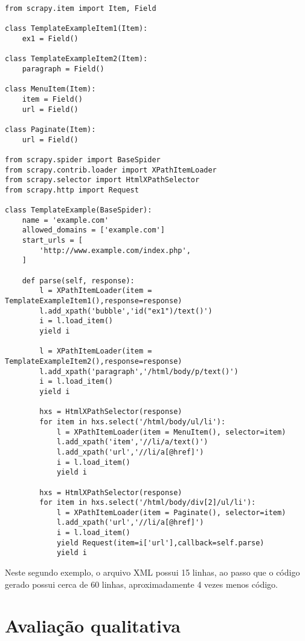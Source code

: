 \pagebreak
{}
\begin{lstlisting}
from scrapy.item import Item, Field

class TemplateExampleItem1(Item):
    ex1 = Field()

class TemplateExampleItem2(Item):
    paragraph = Field()
    
class MenuItem(Item):
    item = Field()
    url = Field()
    
class Paginate(Item):
    url = Field()

from scrapy.spider import BaseSpider
from scrapy.contrib.loader import XPathItemLoader
from scrapy.selector import HtmlXPathSelector
from scrapy.http import Request

class TemplateExample(BaseSpider):
    name = 'example.com'
    allowed_domains = ['example.com']
    start_urls = [
        'http://www.example.com/index.php',
    ]

    def parse(self, response):
        l = XPathItemLoader(item = TemplateExampleItem1(),response=response)
        l.add_xpath('bubble','id("ex1")/text()') 
        i = l.load_item()
        yield i
        
        l = XPathItemLoader(item = TemplateExampleItem2(),response=response)
        l.add_xpath('paragraph','/html/body/p/text()') 
        i = l.load_item()
        yield i
        
        hxs = HtmlXPathSelector(response)
        for item in hxs.select('/html/body/ul/li'):
            l = XPathItemLoader(item = MenuItem(), selector=item)
            l.add_xpath('item','//li/a/text()') 
            l.add_xpath('url','//li/a[@href]') 
            i = l.load_item()
            yield i
                        
        hxs = HtmlXPathSelector(response)
        for item in hxs.select('/html/body/div[2]/ul/li'):
            l = XPathItemLoader(item = Paginate(), selector=item)
            l.add_xpath('url','//li/a[@href]') 
            i = l.load_item()
            yield Request(item=i['url'],callback=self.parse)
            yield i
\end{lstlisting}

Neste segundo exemplo, o arquivo XML possui 15 linhas, ao passo que o código gerado possui cerca de 60 linhas, aproximadamente 4 vezes menos código.

\pagebreak
\section{Avaliação qualitativa}

